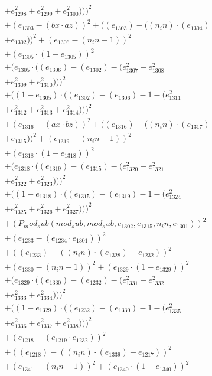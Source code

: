 \documentclass[10pt, a4paper]{article}
\begin{document}
\begin{small}
\begin{align*}
& + e_{1298}^{2} + e_{1299}^{2} + e_{1300}^{2})))^{2} \\
& + (e_{1303} - (bx  \cdot  az))^{2} + ((e_{1303}) - ((n_in)  \cdot  (e_{1304}) \\
& + e_{1302}))^{2} + (e_{1306} - (n_in - 1))^{2} \\
& + (e_{1305}  \cdot  (1 - e_{1305}))^{2} \\
& + (e_{1305}  \cdot  ((e_{1306}) - (e_{1302}) - (e_{1307}^{2} + e_{1308}^{2} \\
& + e_{1309}^{2} + e_{1310}^{2})))^{2} \\
& + ((1 - e_{1305})  \cdot  ((e_{1302}) - (e_{1306}) - 1 - (e_{1311}^{2} \\
& + e_{1312}^{2} + e_{1313}^{2} + e_{1314}^{2})))^{2} \\
& + (e_{1316} - (ax  \cdot  bz))^{2} + ((e_{1316}) - ((n_in)  \cdot  (e_{1317}) \\
& + e_{1315}))^{2} + (e_{1319} - (n_in - 1))^{2} \\
& + (e_{1318}  \cdot  (1 - e_{1318}))^{2} \\
& + (e_{1318}  \cdot  ((e_{1319}) - (e_{1315}) - (e_{1320}^{2} + e_{1321}^{2} \\
& + e_{1322}^{2} + e_{1323}^{2})))^{2} \\
& + ((1 - e_{1318})  \cdot  ((e_{1315}) - (e_{1319}) - 1 - (e_{1324}^{2} \\
& + e_{1325}^{2} + e_{1326}^{2} + e_{1327}^{2})))^{2} \\
& + (P_mod_sub(mod_sub, mod_sub, e_{1302}, e_{1315}, n_in, e_{1301}))^{2} \\
& + (e_{1233} - (e_{1234}  \cdot  e_{1301}))^{2} \\
& + ((e_{1233}) - ((n_in)  \cdot  (e_{1328}) + e_{1232}))^{2} \\
& + (e_{1330} - (n_in - 1))^{2} + (e_{1329}  \cdot  (1 - e_{1329}))^{2} \\
& + (e_{1329}  \cdot  ((e_{1330}) - (e_{1232}) - (e_{1331}^{2} + e_{1332}^{2} \\
& + e_{1333}^{2} + e_{1334}^{2})))^{2} \\
& + ((1 - e_{1329})  \cdot  ((e_{1232}) - (e_{1330}) - 1 - (e_{1335}^{2} \\
& + e_{1336}^{2} + e_{1337}^{2} + e_{1338}^{2})))^{2} \\
& + (e_{1218} - (e_{1219}  \cdot  e_{1232}))^{2} \\
& + ((e_{1218}) - ((n_in)  \cdot  (e_{1339}) + e_{1217}))^{2} \\
& + (e_{1341} - (n_in - 1))^{2} + (e_{1340}  \cdot  (1 - e_{1340}))^{2} \\

\end{align*}
\end{small}
\end{document}
